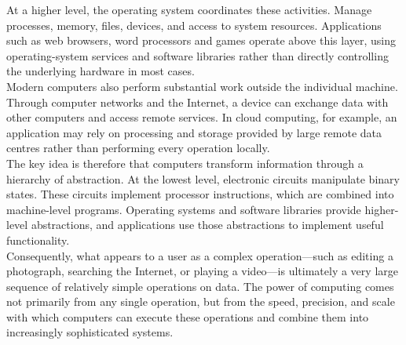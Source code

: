 At a higher level, the operating system coordinates these activities. Manage processes, memory, files, devices, and access to system resources. Applications such as web browsers, word processors and games operate above this layer, using operating-system services and software libraries rather than directly controlling the underlying hardware in most cases.\\

Modern computers also perform substantial work outside the individual machine. Through computer networks and the Internet, a device can exchange data with other computers and access remote services. In cloud computing, for example, an application may rely on processing and storage provided by large remote data centres rather than performing every operation locally.\\

The key idea is therefore that computers transform information through a hierarchy of abstraction. At the lowest level, electronic circuits manipulate binary states. These circuits implement processor instructions, which are combined into machine-level programs. Operating systems and software libraries provide higher-level abstractions, and applications use those abstractions to implement useful functionality.\\

Consequently, what appears to a user as a complex operation—such as editing a photograph, searching the Internet, or playing a video—is ultimately a very large sequence of relatively simple operations on data. The power of computing comes not primarily from any single operation, but from the speed, precision, and scale with which computers can execute these operations and combine them into increasingly sophisticated systems.